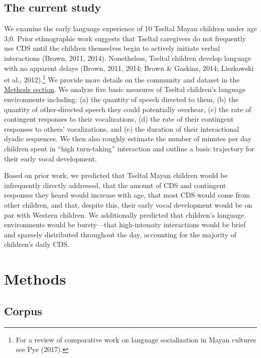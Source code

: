 \documentclass[floatsintext,man]{apa6}
\theoremstyle{definition}
\theoremstyle{definition}
\theoremstyle{definition}
\theoremstyle{remark}
\begin{document}
\subsection{The current study}\label{intro-currentstudy}

We examine the early language experience of 10 Tseltal Mayan children
under age 3;0. Prior ethnographic work suggests that Tseltal caregivers
do not frequently use CDS until the children themselves begin to
actively initiate verbal interactions (Brown, 2011, 2014). Nonetheless,
Tseltal children develop language with no apparent delays (Brown, 2011,
2014; Brown \& Gaskins, 2014; Liszkowski et al., 2012).\footnote{For a
  review of comparative work on language socialization in Mayan cultures
  see Pye (2017).} We provide more details on the community and dataset
in the \protect\hyperlink{methods}{Methods section}. We analyze five
basic measures of Tseltal children's language environments including:
(a) the quantity of speech directed to them, (b) the quantity of
other-directed speech they could potentially overhear, (c) the rate of
contingent responses to their vocalizations, (d) the rate of their
contingent responses to others' vocalizations, and (e) the duration of
their interactional dyadic sequences. We then also roughly estimate the
number of minutes per day children spent in \enquote{high turn-taking}
interaction and outline a basic trajectory for their early vocal
development.

Based on prior work, we predicted that Tseltal Mayan children would be
infrequently directly addressed, that the amount of CDS and contingent
responses they heard would increase with age, that most CDS would come
from other children, and that, despite this, their early vocal
development would be on par with Western children. We additionally
predicted that children's language environments would be bursty---that
high-intensity interactions would be brief and sparsely distributed
throughout the day, accounting for the majority of children's daily CDS.

\hypertarget{methods}{\section{Methods}\label{methods}}

\subsection{Corpus}\label{methods-dataset}
\end{document}
